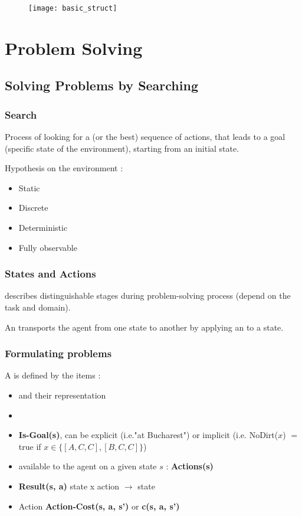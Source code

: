 \begin{figure}[H]
    \centering
    \texttt{[image: basic\_struct]}
\end{figure}

\chapter{Problem Solving}

\section{Solving Problems by Searching}

\subsection{Search}

Process of looking for a (or the best) sequence of actions, that leads to a goal (specific state of the environment), starting from an initial state.

Hypothesis on the environment :
\begin{itemize}
\item Static
\item Discrete
\item Deterministic
\item Fully observable
\end{itemize}

\subsection{States and Actions}

 describes distinguishable stages during problem-solving process (depend on the task and domain).

An  transports the agent from one state to another by applying an  to a state.

\subsection{Formulating problems}

A  is defined by the items :
\begin{itemize}
\item {} and their representation
\item {}
\item {} \textbf{Is-Goal(s)}, can be explicit (i.e."at Bucharest") or implicit (i.e. NoDirt($x$) $=$ true if $x \in \{[A,C,C],[B,C,C]\}$)
\item {} available to the agent on a given state $s$ : \textbf{Actions(s)}
\item {} \textbf{Result(s, a)} state x action $\rightarrow$ state
\item Action  \textbf{Action-Cost(s, a, s')} or \textbf{c(s, a, s')}
\end{itemize}

